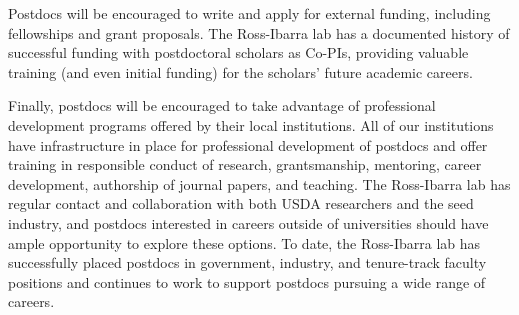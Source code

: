 Postdocs will be encouraged to write and apply for external funding, including fellowships and grant proposals.  The Ross-Ibarra lab has a documented history of successful funding with postdoctoral scholars as Co-PIs, providing valuable training (and even initial funding) for the scholars' future academic careers.

Finally, postdocs will be encouraged to take advantage of professional development programs offered by their local institutions. All of our institutions have infrastructure in place for professional development of postdocs and offer training in responsible conduct of research, grantsmanship, mentoring, career development, authorship of journal papers, and teaching. The Ross-Ibarra lab has regular contact and collaboration with both USDA researchers and the seed industry, and postdocs interested in careers outside of universities should have ample opportunity to explore these options.  To date, the Ross-Ibarra lab has successfully placed postdocs in government, industry, and tenure-track faculty positions and continues to work to support postdocs pursuing a wide range of careers.